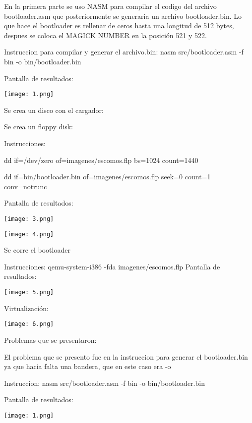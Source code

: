 \documentclass[12pt, a4paper]{report}
\begin{document}
\begin{center}
En la primera parte se uso NASM para compilar el codigo del archivo bootloader.asm que posteriormente se generaria un archivo bootloader.bin. Lo que hace el bootloader es rellenar de ceros hasta una longitud de 512 bytes, despues se coloca el MAGICK NUMBER en la posición 521 y 522.

\bigskip
\bigskip

Instruccion para compilar y generar el archivo.bin: nasm src/bootloader.asm -f bin -o  bin/bootloader.bin

Pantalla de resultados:

\bigskip
\bigskip

\texttt{[image: 1.png]}

\end{center}

\newpage

\begin{center}
Se crea un disco con el cargador:

Se crea un floppy disk:

Instrucciones: 
\bigskip

dd if=/dev/zero of=imagenes/escomos.flp bs=1024 count=1440

\bigskip

dd if=bin/bootloader.bin of=imagenes/escomos.flp seek=0 count=1 conv=notrunc

\bigskip

Pantalla de resultados:

\bigskip

\texttt{[image: 3.png]}

\bigskip

\texttt{[image: 4.png]}

\bigskip

Se corre el bootloader

\bigskip

Instrucciones: qemu-system-i386 -fda imagenes/escomos.flp
Pantalla de resultados:

\bigskip

\texttt{[image: 5.png]}

\bigskip

Virtualización:

\bigskip

\texttt{[image: 6.png]}


\end{center}

\newpage

\begin{center}
Problemas que se presentaron: 

El problema que se presento fue en la instruccion para generar el bootloader.bin ya que hacia falta una bandera, que en este caso era -o

\bigskip

Instruccion: nasm src/bootloader.asm -f bin -o  bin/bootloader.bin

\bigskip

Pantalla de resultados:

\bigskip

\texttt{[image: 1.png]}


\end{center}
\end{document}
